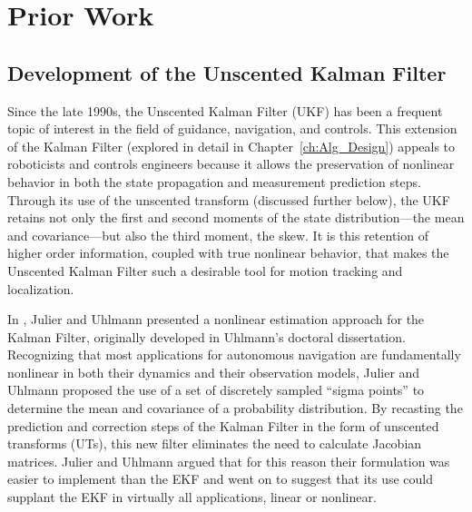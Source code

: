 \chapter{Prior Work} \label{ch:Prior_Work}

\section{Development of the Unscented Kalman Filter}

Since the late 1990s, the Unscented Kalman Filter (UKF) has been a frequent topic of interest in the field of guidance, navigation, and controls. This extension of the Kalman Filter (explored in detail in Chapter~\ref{ch:Alg_Design}) appeals to roboticists and controls engineers because it allows the preservation of nonlinear behavior in both the state propagation and measurement prediction steps. Through its use of the unscented transform (discussed further below), the UKF retains not only the first and second moments of the state distribution---the mean and covariance---but also the third moment, the skew. It is this retention of higher order information, coupled with true nonlinear behavior, that makes the Unscented Kalman Filter such a desirable tool for motion tracking and localization.

In \cite{Julier1997}, Julier and Uhlmann presented a nonlinear estimation approach for the Kalman Filter, originally developed in Uhlmann's doctoral dissertation. Recognizing that most applications for autonomous navigation are fundamentally nonlinear in both their dynamics and their observation models, Julier and Uhlmann proposed the use of a set of discretely sampled ``sigma points'' to determine the mean and covariance of a probability distribution. By recasting the prediction and correction steps of the Kalman Filter in the form of unscented transforms (UTs), this new filter eliminates the need to calculate Jacobian matrices. Julier and Uhlmann argued that for this reason their formulation was easier to implement than the EKF and went on to suggest that its use could supplant the EKF in virtually all applications, linear or nonlinear.

